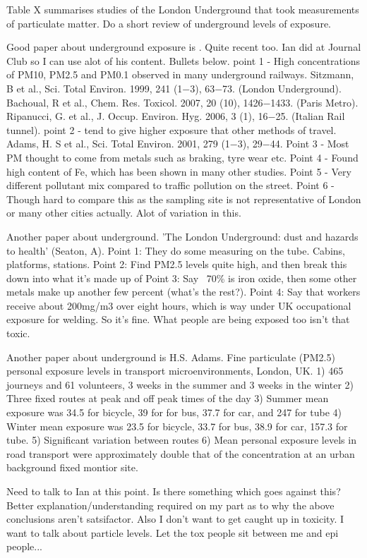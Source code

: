 Table X summarises studies of the London Underground that took measurements of particulate matter. Do a short review of underground levels of exposure.

Good paper about underground exposure is \cite{Loxham2013}. Quite recent too. Ian did at Journal Club so I can use alot of his content. Bullets below.
point 1 - High concentrations of PM10, PM2.5 and PM0.1 observed in many underground railways. Sitzmann, B et al., Sci. Total Environ. 1999, 241 (1−3), 63−73. (London Underground). Bachoual, R et al., Chem. Res. Toxicol. 2007, 20 (10), 1426−1433. (Paris Metro). Ripanucci, G. et al., J. Occup. Environ. Hyg. 2006, 3 (1), 16−25. (Italian Rail tunnel).
point 2 - tend to give higher exposure that other methods of travel. Adams, H. S et al., Sci. Total Environ. 2001, 279 (1−3), 29−44.
Point 3 - Most PM thought to come from metals such as braking, tyre wear etc.
Point 4 - Found high content of Fe, which has been shown in many other studies.
Point 5 - Very different pollutant mix compared to traffic pollution on the street.
Point 6 - Though hard to compare this as the sampling site is not representative of London or many other cities actually. Alot of variation in this.

Another paper about underground. 'The London Underground: dust and hazards to health' (Seaton, A).
Point 1: They do some measuring on the tube. Cabins, platforms, stations.
Point 2: Find PM2.5 levels quite high, and then break this down into what it's made up of
Point 3: Say ~70\% is iron oxide, then some other metals make up another few percent (what's the rest?).
Point 4: Say that workers receive about 200mg/m3 over eight hours, which is way under UK occupational exposure for welding. So it's fine. What people are being exposed too isn't that toxic.

Another paper about underground is H.S. Adams. Fine particulate (PM2.5) personal exposure levels in transport microenvironments, London, UK. \cite{Adams2001}
1) 465 journeys and 61 volunteers, 3 weeks in the summer and 3 weeks in the winter
2) Three fixed routes at peak and off peak times of the day
3) Summer mean exposure was 34.5 for bicycle, 39 for for bus, 37.7 for car, and 247 for tube
4) Winter mean exposure was 23.5 for bicycle, 33.7 for bus, 38.9 for car, 157.3 for tube.
5) Significant variation between routes
6) Mean personal exposure levels in road transport were approximately double that of the concentration at an urban background fixed montior site.

Need to talk to Ian at this point. Is there something which goes against this? Better explanation/understanding required on my part as to why the above conclusions aren't satsifactor. Also I don't want to get caught up in toxicity. I want to talk about particle levels. Let the tox people sit between me and epi people...


